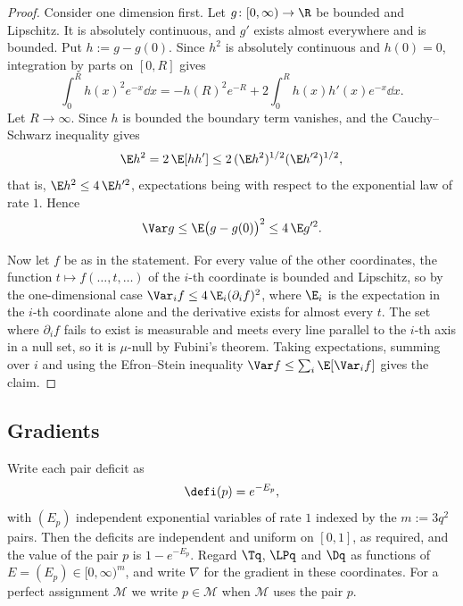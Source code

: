 \begin{proof}
Consider one dimension first. Let $g\colon[0,\infty)\to\R$ be bounded and Lipschitz. It is
absolutely continuous, and $g'$ exists almost everywhere and is bounded. Put $h:=g-g(0)$.
Since $h^2$ is absolutely continuous and $h(0)=0$, integration by parts on $[0,R]$ gives
\[
\int_0^Rh(x)^2e^{-x}\dd x=-h(R)^2e^{-R}+2\int_0^Rh(x)h'(x)e^{-x}\dd x .
\]
Let $R\to\infty$. Since $h$ is bounded the boundary term vanishes, and the Cauchy--Schwarz
inequality gives
\[
\E h^2=2\,\E[hh']\le2\,(\E h^2)^{1/2}(\E h'^2)^{1/2},
\]
that is, $\E h^2\le4\,\E h'^2$, expectations being with respect to the exponential law of
rate $1$. Hence
\[
\Var g\le\E\bigl(g-g(0)\bigr)^2\le4\,\E g'^2 .
\]

Now let $f$ be as in the statement. For every value of the other coordinates, the function
$t\mapsto f(\dots,t,\dots)$ of the $i$-th coordinate is bounded and Lipschitz, so by the
one-dimensional case $\Var_if\le4\,\E_i(\partial_if)^2$, where $\E_i$ is the expectation
in the $i$-th coordinate alone and the derivative exists for almost every $t$. The set
where $\partial_if$ fails to exist is measurable and meets every line parallel to the
$i$-th axis in a null set, so it is $\mu$-null by Fubini's theorem. Taking expectations,
summing over $i$ and using the Efron--Stein inequality $\Var f\le\sum_i\E[\Var_i f]$ gives the claim.
\end{proof}

\subsection{Gradients}\label{sec:variance-gradient}

Write each pair deficit as
\[
\defi(p)=e^{-E_p},
\]
with $(E_p)$ independent exponential variables of rate $1$ indexed by the $m:=3q^2$ pairs.
Then the deficits are independent and uniform on $[0,1]$, as required, and the value of the
pair $p$ is $1-e^{-E_p}$. Regard $\Tq$, $\LPq$ and $\Dq$ as functions of
$E=(E_p)\in[0,\infty)^m$, and write $\nabla$ for the gradient in these coordinates. For a
perfect assignment $\mathcal M$ we write $p\in\mathcal M$ when $\mathcal M$ uses the pair
$p$.

